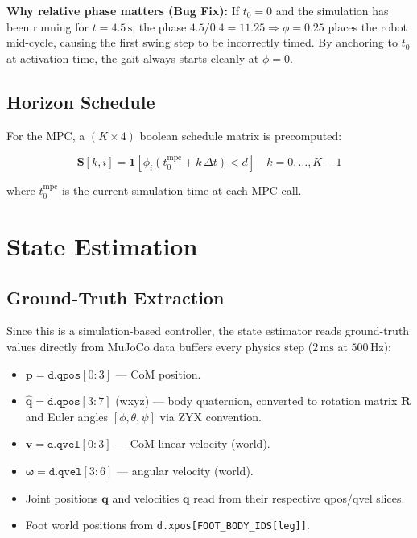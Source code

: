 \documentclass[12pt,a4paper]{report}
\newcommand{\vect}[1]{\bm{#1}}
\newcommand{\mat}[1]{\mathbf{#1}}
\begin{document}
\textbf{Why relative phase matters (Bug Fix):}  If $t_0 = 0$ and the
simulation has been running for $t = 4.5\,\text{s}$, the phase
$4.5/0.4 = 11.25 \Rightarrow \phi = 0.25$ places the robot mid-cycle, causing
the first swing step to be incorrectly timed.  By anchoring to $t_0$ at
activation time, the gait always starts cleanly at $\phi = 0$.

\section{Horizon Schedule}

For the MPC, a $(K\times4)$ boolean schedule matrix is precomputed:

\begin{equation}
    \mat{S}[k, i] = \mathbf{1}\!\left[\phi_i(t_0^{\text{mpc}} + k\,\Delta t) < d\right]
    \quad k=0,\ldots,K-1
\end{equation}

where $t_0^{\text{mpc}}$ is the current simulation time at each MPC call.

\chapter{State Estimation}

\section{Ground-Truth Extraction}

Since this is a simulation-based controller, the state estimator reads
ground-truth values directly from MuJoCo data buffers every physics step
($2\,\text{ms}$ at $500\,\text{Hz}$):

\begin{itemize}[noitemsep]
  \item $\vect{p} = \texttt{d.qpos}[0\!:\!3]$ — CoM position.
  \item $\hat{\vect{q}} = \texttt{d.qpos}[3\!:\!7]$ (wxyz) — body quaternion,
        converted to rotation matrix $\mat{R}$ and Euler angles
        $[\phi, \theta, \psi]$ via ZYX convention.
  \item $\vect{v} = \texttt{d.qvel}[0\!:\!3]$ — CoM linear velocity (world).
  \item $\vect{\omega} = \texttt{d.qvel}[3\!:\!6]$ — angular velocity (world).
  \item Joint positions $\vect{q}$ and velocities $\dot{\vect{q}}$ read from
        their respective qpos/qvel slices.
  \item Foot world positions from \texttt{d.xpos[FOOT\_BODY\_IDS[leg]]}.
\end{itemize}
\end{document}
